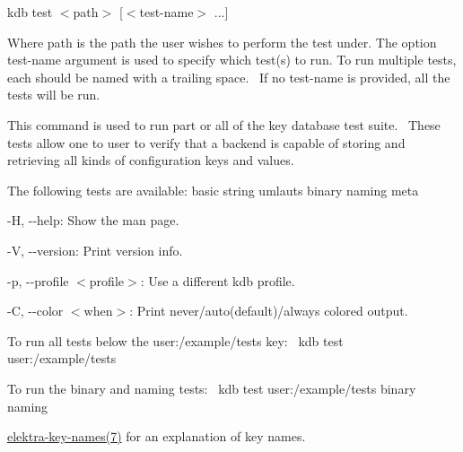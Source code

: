 {\ttfamily kdb test $<$path$>$ \mbox{[}$<$test-\/name$>$ ...\mbox{]}}~\newline


Where {\ttfamily path} is the path the user wishes to perform the test under. The option {\ttfamily test-\/name} argument is used to specify which test(s) to run. To run multiple tests, each should be named with a trailing space.~\newline
 If no {\ttfamily test-\/name} is provided, all the tests will be run.~\newline


This command is used to run part or all of the key database test suite.~\newline
 These tests allow one to user to verify that a backend is capable of storing and retrieving all kinds of configuration keys and values.~\newline


The following tests are available\+: basic string umlauts binary naming meta~\newline



\begin{DoxyItemize}
\item {\ttfamily -\/H}, {\ttfamily -\/-\/help}\+: Show the man page.
\item {\ttfamily -\/V}, {\ttfamily -\/-\/version}\+: Print version info.
\item {\ttfamily -\/p}, {\ttfamily -\/-\/profile $<$profile$>$}\+: Use a different kdb profile.
\item {\ttfamily -\/C}, {\ttfamily -\/-\/color $<$when$>$}\+: Print never/auto(default)/always colored output.
\end{DoxyItemize}

To run all tests below the {\ttfamily user\+:/example/tests} key\+:~\newline
 {\ttfamily kdb test user\+:/example/tests}~\newline


To run the {\ttfamily binary} and {\ttfamily naming} tests\+:~\newline
 {\ttfamily kdb test user\+:/example/tests binary naming}~\newline



\begin{DoxyItemize}
\item \hyperlink{doc_help_elektra-key-names_md}{elektra-\/key-\/names(7)} for an explanation of key names. 
\end{DoxyItemize}